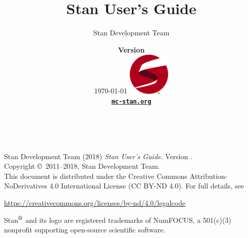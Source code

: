\title{\Huge\bf Stan User's Guide\vspace*{-12pt}}
\author{\vspace*{-12pt}\Large Stan Development Team}

\date{\vspace*{24pt}
{\large\bfseries Version \stanversion}
\\[6pt] 
{\small \today}
\vfill
\includegraphics[width=0.8in]{img/logo.eps}
\\[-2pt]
{\small\bfseries \href{http://mc-stan.org/}{\tt mc-stan.org}}
}
\maketitle

\newpage
\thispagestyle{empty}
\mbox{ }
\vfill
\begin{center}
\begin{minipage}[t]{0.75\textwidth}
\small
Stan Development Team (2018)
{\it Stan User's Guide}. Version
\stanversion.
\vspace*{20pt}
\mbox{ }
\\
Copyright \copyright \ 2011--2018, Stan Development Team.
\vspace*{28pt}
\mbox{} \\
This document is distributed under the Creative Commons
Attribution-NoDerivatives 4.0 International License (CC BY-ND 4.0).
For full details, see
\begin{center}
\url{https://creativecommons.org/licenses/by-nd/4.0/legalcode}
\end{center}
Stan\hspace*{-1pt}$^{\mbox{\footnotesize\vspace*{-1.5pt}\textregistered}}$ and its logo are
registered trademarks of NumFOCUS, a 501(c)(3) nonprofit supporting
open-source scientific software.
\end{minipage}
\vspace*{24pt}
\mbox{ }
\end{center}
